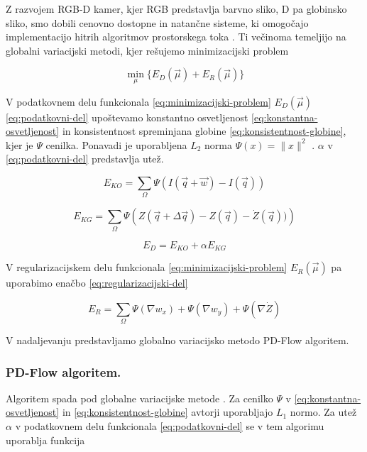 Z razvojem RGB-D kamer, kjer RGB predstavlja barvno sliko, D pa globinsko sliko, smo dobili cenovno dostopne in natančne sisteme, ki omogočajo implementacijo hitrih algoritmov prostorskega toka \cite{yan2016scene,jaimez2015primal}. Ti večinoma temeljijo na globalni variacijski metodi, kjer rešujemo minimizacijski problem 

\begin{equation}\label{eq:minimizacijski-problem}
	\min_{\mu}\{E_D(\vec{\mu}) + E_R(\vec{\mu})\}
\end{equation}

V podatkovnem delu funkcionala \eqref{eq:minimizacijski-problem} $E_D(\vec{\mu})$ \eqref{eq:podatkovni-del} upoštevamo konstantno osvetljenost \eqref{eq:konstantna-osvetljenost} in konsistentnost spreminjana globine \eqref{eq:konsistentnost-globine}, kjer je  $\Psi$ cenilka. Ponavadi je uporabljena $L_2$ norma $\Psi(x) = \| x \|^2$ \cite{yan2016scene}. $\alpha$ v \eqref{eq:podatkovni-del} predstavlja utež.

\begin{equation}\label{eq:konstantna-osvetljenost}
	E_{KO} = \sum_\Omega \Psi( I(\vec{q} + \vec{w}) - I(\vec{q}))
\end{equation}

\begin{equation}\label{eq:konsistentnost-globine}
	E_{KG} = \sum_\Omega \Psi\left( Z(\vec{q} + \Delta \vec{q}) - Z(\vec{q}) - \dot{Z}(\vec{q}))\right)
\end{equation}

\begin{equation}\label{eq:podatkovni-del}
	E_D = E_{KO} + \alpha E_{KG}
\end{equation}

V regularizacijskem delu funkcionala \eqref{eq:minimizacijski-problem} $E_R(\vec{\mu})$ pa uporabimo enačbo \eqref{eq:regularizacijski-del}

\begin{equation}\label{eq:regularizacijski-del}
	E_R = \sum_\Omega \Psi\left( \nabla w_x \right) + \Psi\left( \nabla w_y \right) + \Psi\left( \nabla \dot{Z} \right)
\end{equation}

V nadaljevanju predstavljamo globalno variacijsko metodo PD-Flow algoritem.


\subsubsection{PD-Flow algoritem.}\label{sec:pd-flow}
Algoritem spada pod globalne variacijske metode \cite{jaimez2015primal}. Za cenilko $\Psi$ v \eqref{eq:konstantna-osvetljenost} in \eqref{eq:konsistentnost-globine} avtorji uporabljajo $L_1$ normo. Za utež $\alpha$ v podatkovnem delu funkcionala \eqref{eq:podatkovni-del} se v tem algorimu uporablja funkcija 

